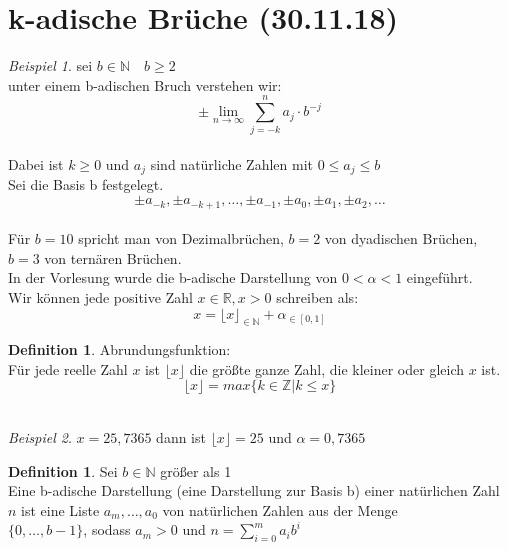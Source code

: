 \documentclass[12pt,a4paper,titlepage]{article} %
\theoremstyle{definition}
\newtheorem{defi}[satz]{Definition}
\theoremstyle{remark}
\newtheorem*{bsp}{Beispiel}
\newcommand{\N}{\mathbb{N}}
\newcommand{\Z}{\mathbb{Z}}
\newcommand{\R}{\mathbb{R}}
\newcommand{\limes}[1]{\lim\limits_{#1\rightarrow\infty}}
\begin{document}
	\section{k-adische Brüche (30.11.18)}
	\begin{bsp}
		sei \(b \in \N \quad b \geq 2\)\\
		unter einem b-adischen Bruch verstehen wir:\\
		\[\pm \limes{n} \sum_{j=-k}^{n} a_j \cdot b^{-j}\]\\
		Dabei ist \(k \geq 0\) und \(a_j\) sind natürliche Zahlen mit \(0 \leq a_j \leq b\)\\
		Sei die Basis b festgelegt.\\
		\[\pm a_{-k}, \pm a_{-k+1}, \dots ,\pm a_{-1}, \pm a_0, \pm a_1, \pm a_2, \dots\]\\
		Für \(b = 10\) spricht man von Dezimalbrüchen, \(b = 2\) von dyadischen Brüchen, \(b = 3\) von ternären Brüchen.\\
		In der Vorlesung wurde die b-adische Darstellung von \(0 < \alpha < 1\) eingeführt. \\
		Wir können jede positive Zahl \(x \in \R, x > 0\) schreiben als:\\
		\[x = {\lfloor x \rfloor}_{\in \N} + \alpha_{\in [0, 1]} \]
	\end{bsp}
	\begin{defi}
		Abrundungsfunktion:\\
		Für jede reelle Zahl \(x\) ist \(\lfloor x \rfloor\) die größte ganze Zahl, die kleiner oder gleich \(x\) ist.\\
		\[\lfloor x \rfloor = max\{k \in \Z | k \leq x\}\]\\
		\begin{bsp}
			\(x = 25,7365\) dann ist \(\lfloor x \rfloor = 25\) und \(\alpha = 0,7365\)\\
		\end{bsp}
	\end{defi}
	\begin{defi}
		Sei \(b \in \N\) größer als 1\\
		Eine b-adische Darstellung (eine Darstellung zur Basis b) einer natürlichen Zahl \(n\) ist eine Liste \(a_m, \dots, a_0\) von natürlichen Zahlen aus der Menge\\
		\(\{0, \dots, b-1\}\), sodass \(a_m > 0\) und \(n = \sum_{i=0}^{m} a_ib^i\)
	\end{defi}
\end{document}
